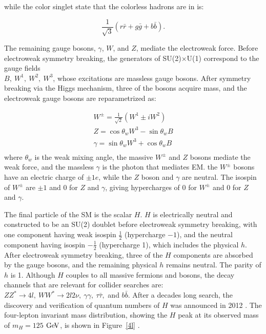 while the color singlet state that the colorless hadrons are in is:

\begin{equation}
\frac{1}{\sqrt{3}}(r\bar{r} + g\bar{g} + b\bar{b}).
\end{equation}

\indent The remaining gauge bosons, $\gamma$, $W$, and $Z$, mediate the electroweak force. Before electroweak symmetry breaking, the generators of SU(2)$\times$U(1) correspond to the gauge fields \\
$B,\  W^1,\  W^2,\  W^3$, whose excitations are massless gauge bosons. After symmetry breaking via the Higgs mechanism, three of the bosons acquire mass, and the electroweak gauge bosons are reparametrized as:

\begin{equation}
\begin{split}
W^\pm = \frac{1}{\sqrt{2}}(W^1 \pm iW^2) \\
Z = \cos\theta_w W^3 - \sin\theta_w B \\
\gamma = \sin\theta_w W^3 + \cos\theta_w B \\
\end{split}
\end{equation}
where $\theta_w$ is the weak mixing angle, the massive $W^\pm$ and $Z$ bosons mediate the weak force, and the massless $\gamma$ is the photon that mediates EM. the $W^\pm$ bosons have an electric charge of $\pm 1e$, while the $Z$ boson and $\gamma$ are neutral. The isospin of $W^\pm$ are $\pm1$ and 0 for $Z$ and $\gamma$, giving hypercharges of $0$ for $W^\pm$ and 0 for $Z$ and $\gamma$. 

\indent The final particle of the SM is the scalar $H$. $H$ is electrically neutral and constructed to be an SU(2) doublet before electroweak symmetry breaking, with one component having weak isospin $\frac{1}{2}$ (hypercharge $-1$), and the neutral component having isospin $-\frac{1}{2}$ (hypercharge 1), which includes the physical $h$. After electroweak symmetry breaking, three of the $H$ components are absorbed by the gauge bosons, and the remaining physical $h$ remains neutral. The parity of $h$ is 1. Although $H$ couples to all massive fermions and bosons, the decay channels that are relevant for collider searches are: $ZZ^* \rightarrow 4l,\  WW^* \rightarrow 2l2\nu,\  \gamma\gamma,\  \tau\bar{\tau},$ and $b\bar{b}$. After a decades long search, the discovery and verification of quantum numbers of $H$ was announced in 2012 \cite{Chatrchyan:2012xdj, Aad:2012tfa}. The four-lepton invariant mass distribution, showing the $H$ peak at its observed mass of $m_H = 125$ $\mathrm{Ge\kern -0.1em V}$, is shown in Figure~\ref{4l} \cite{CMS:HZZ}.


